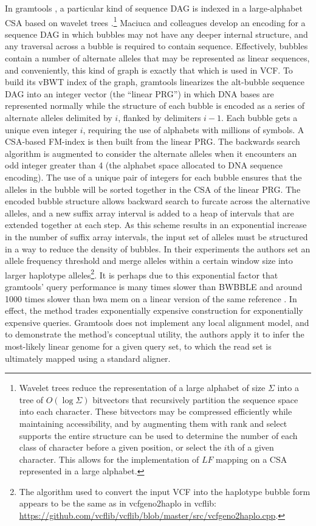 In gramtools \cite{maciuca2016natural}, a particular kind of sequence DAG is indexed in a large-alphabet CSA based on wavelet trees \cite{grossi2003high}.\footnote{Wavelet trees reduce the representation of a large alphabet of size $\Sigma$ into a tree of $O(\log{\Sigma})$ bitvectors that recursively partition the sequence space into each character.
These bitvectors may be compressed efficiently while maintaining accessibility, and by augmenting them with rank and select supports the entire structure can be used to determine the number of each class of character before a given position, or select the $i$th of a given character.
This allows for the implementation of $LF$ mapping on a CSA represented in a large alphabet.}
Maciuca and colleagues develop an encoding for a sequence DAG in which bubbles may not have any deeper internal structure, and any traversal across a bubble is required to contain sequence.
Effectively, bubbles contain a number of alternate alleles that may be represented as linear sequences, and conveniently, this kind of graph is exactly that which is used in VCF.
To build its vBWT index of the graph, gramtools linearizes the alt-bubble sequence DAG into an integer vector (the ``linear PRG'') in which DNA bases are represented normally while the structure of each bubble is encoded as a series of alternate alleles delimited by $i$, flanked by delimiters $i-1$.
Each bubble gets a unique even integer $i$, requiring the use of alphabets with millions of symbols.
A CSA-based FM-index is then built from the linear PRG.
The backwards search algorithm is augmented to consider the alternate alleles when it encounters an odd integer greater than 4 (the alphabet space allocated to DNA sequence encoding).
The use of a unique pair of integers for each bubble ensures that the alleles in the bubble will be sorted together in the CSA of the linear PRG.
The encoded bubble structure allows backward search to furcate across the alternative alleles, and a new suffix array interval is added to a heap of intervals that are extended together at each step.
As this scheme results in an exponential increase in the number of suffix array intervals, the input set of alleles must be structured in a way to reduce the density of bubbles.
In their experiments the authors set an allele frequency threshold and merge alleles within a certain window size into larger haplotype alleles\footnote{The algorithm used to convert the input VCF into the haplotype bubble form appears to be the same as in vcfgeno2haplo in vcflib: \url{https://github.com/vcflib/vcflib/blob/master/src/vcfgeno2haplo.cpp}.}.
It is perhaps due to this exponential factor that gramtools' query performance is many times slower than BWBBLE and around 1000 times slower than bwa mem on a linear version of the same reference \cite{maciuca2016natural}.
In effect, the method trades exponentially expensive construction for exponentially expensive queries.
Gramtools does not implement any local alignment model, and to demonstrate the method's conceptual utility, the authors apply it to infer the most-likely linear genome for a given query set, to which the read set is ultimately mapped using a standard aligner.

